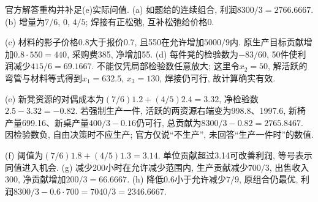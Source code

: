 \begin{solution}
官方解答重构并补足(e)实际问值. (a) 如题给的连续组合, 利润$8300/3=2766.6667$. (b) 增量为$7/6$, 0, $4/5$; 焊接有正松弛, 互补松弛给价格0.

(c) 材料的影子价格0.8大于报价0.7, 且550在允许增加$5000/9$内. 原生产目标贡献增加$0.8\cdot550=440$, 采购费385, 净增加55. (d) 每件凳的检验数为$-83/60$, 50件使利润减少$415/6=69.1667$. 不能仅凭局部检验数任意放大; 这里令$x_2=50$, 解活跃的弯管与材料等式得到$x_1=632.5$, $x_3=130$, 焊接仍可行, 故计算确实有效.

(e) 新凳资源的对偶成本为$(7/6)1.2+(4/5)2.4=3.32$, 净检验数$2.5-3.32=-0.82$. 若强制生产一件, 活跃的两资源右端变为998.8、1997.6, 新椅产量699.16、新桌产量$400/3-0.16$仍可行, 总贡献为$8300/3-0.82=2765.8467$. 因检验数负, 自由决策时不应生产; 官方仅说“不生产”, 未回答“生产一件时”的数值.

(f) 阈值为$(7/6)1.8+(4/5)1.3=3.14$. 单位贡献超过3.14可改善利润, 等号表示同值进入机会. (g) 减少200小时在允许减少范围内, 生产贡献减少$700/3$, 出售收入300, 净贡献增加$200/3=66.6667$. (h) 降低0.6小于允许减少$7/9$, 原组合仍最优, 利润$8300/3-0.6\cdot700=7040/3=2346.6667$.
\end{solution}

